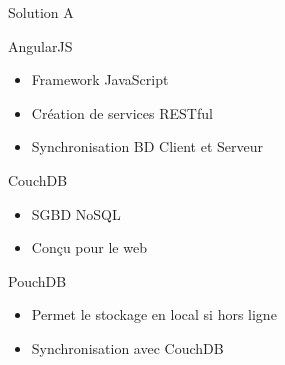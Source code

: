 \author{Juan \textsc{Bermudez}}
\begin{frame}{Solution A}
		\begin{block}{AngularJS}
		\begin{itemize}
			\item Framework JavaScript
			\item Création de services RESTful
			\item Synchronisation BD Client et Serveur
		\end{itemize}
		\end{block}
		\begin{block}{CouchDB}
			\begin{itemize}
			\item SGBD NoSQL
			\item Conçu pour le web
			\end{itemize}
		\end{block}
		\begin{block}{PouchDB}
			\begin{itemize}
			\item Permet le stockage en local si hors ligne
			\item Synchronisation avec CouchDB
			\end{itemize}
		\end{block}
\end{frame}
